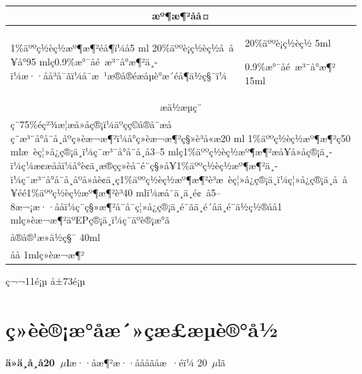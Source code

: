 \documentclass[UTF8,10pt,a4paper,fontset=fandol]{ctexart}
\newcommand{\fieldvalue}[1]{#1}
\newcommand{\handwritten}[1]{#1}
\begin{document}
\begin{tabularx}{\textwidth}{|X|X|}
\hline
\multicolumn{2}{|c|}{æº¶æ¶²åå¤}\\
\hline
1\%äººç½èç½æº¶æ¶²éå¶ï¼å5 ml 20\%äººè¡ç½èç½å å¥å°95 mlç0.9\%æ°¯åé æ³¨å°æ¶²ä¸­ï¼æ··åå³å¯ãï¼å¯æ ¹æ®å®éæåµè°æ´éå¶ä½ç§¯ï¼&
20\%äººè¡ç½èç½\quad
\fieldvalue{\handwritten{5}}\quad ml

\vspace{2mm}
0.9\%æ°¯åé æ³¨å°æ¶²\quad
\fieldvalue{\handwritten{15}}\quad ml\\
\hline
\multicolumn{2}{|c|}{æä½æµç¨}\\
\hline
\multicolumn{2}{|l|}{ç¨75\%éç²¾æ¦æ­å»å­ç®¡ï¼äºçç©å®å¨æåç¨æ³¨å°å¨å¸åºç»èæ¬æ¶²ï¼å°ç»èæ¬æ¶²ç§»è³å«æ20 ml 1\%äººç½èç½æº¶æ¶²ç50 mlæ èç¦»å¿ç®¡ä¸­ï¼ç¨æ³¨å°å¨å¸å3--5 mlç1\%äººç½èç½æº¶æ¶²æå¥å»å­ç®¡ä¸­ï¼ç¼æ¢æååï¼å°è¢ä¸­æ®çç»èå¨é¨ç§»å¥1\%äººç½èç½æº¶æ¶²ä¸­ï¼ç¨æ³¨å°å¨å¸åºå»å­è¢ä¸­ç1\%äººç½èç½æº¶æ¶²è³æ èç¦»å¿ç®¡ä¸­ï¼ç¦»å¿ç®¡ä¸­å å¥éé1\%äººç½èç½æº¶æ¶²è³40 mlï¼æå¨ä¸ä¸é¢ å5--8æ¬¡æ··ååï¼ç¨ç§»æ¶²å¨å¨ç¦»å¿ç®¡ä¸é¨ãä¸­é´åä¸é¨ä½ç½®åå1 mlç»èæ¬æ¶²äºEPç®¡ä¸­ï¼ç¨äºè®¡æ°ã}\\
\hline
\multicolumn{2}{|l|}{å®å®¹æ»ä½ç§¯\quad
\fieldvalue{\handwritten{40}}\quad ml}\\
\hline
\multicolumn{2}{|l|}{åå\quad
\fieldvalue{\handwritten{1}}\quad mlç»èæ¬æ¶²}\\
\hline
\end{tabularx}

\begin{center}
ç¬¬11é¡µ å±73é¡µ
\end{center}

\newpage

\section*{ç»èè®¡æ°åæ´»çæ£æµè®°å½}

\noindent
\textbf{ä»ä¸­å¸å20~$\mu$l}æ··åæ¶²æ··åååãåæ ·éï¼
\fieldvalue{\handwritten{20}}~$\mu$lã
\end{document}
